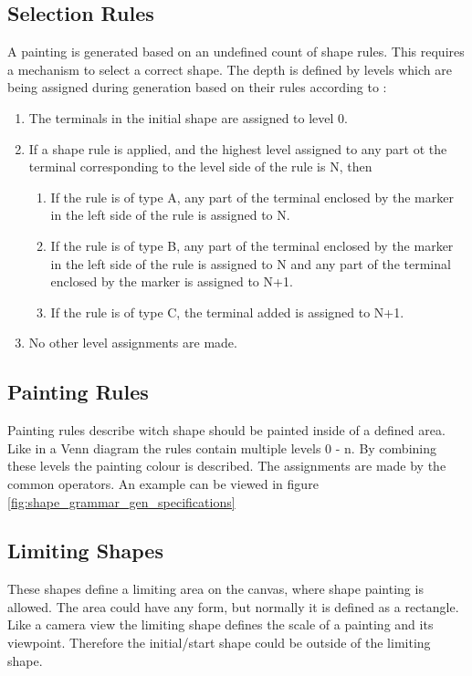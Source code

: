 \subsection{Selection Rules}
\label{sec:Shape_Grammar_Selection_Rules}
A painting is generated based on an undefined count of shape rules. This requires a mechanism to select a correct shape. The depth is defined by levels which are being assigned during generation based on their rules according to \citep{shapeGrammars:1972}:
\begin{displayquote}
    \begin{enumerate}
        \item The terminals in the initial shape are assigned to level 0.
        \item If a shape rule is applied, and the highest level assigned to any part ot the terminal corresponding to the level side of the rule is N, then
        \begin{enumerate}
            \item If the rule is of type A, any part of the terminal enclosed by the marker in the left side of the rule is assigned to N.
            \item If the rule is of type B, any part of the terminal enclosed by the marker in the left side of the rule is assigned to N and any part of the terminal enclosed by the marker is assigned to N+1.
            \item If the rule is of type C, the terminal added is assigned to N+1.
        \end{enumerate}
        \item No other level assignments are made.
    \end{enumerate}
\end{displayquote}

\subsection{Painting Rules}
\label{sec:Shape_Grammar_Painting_Rules}
Painting rules describe witch shape should be painted inside of a defined area. Like in a Venn diagram the rules contain multiple levels 0 - n. By combining these levels the painting colour is described\citep{shapeGrammars:1972}. The assignments are made by the common operators. An example can be viewed in figure \ref{fig:shape_grammar_gen_specifications}

\subsection{Limiting Shapes}
\label{sec:Shape_Grammar_Limiting_Shapes}
These shapes define a limiting area on the canvas, where shape painting is allowed. 
The area could have any form, but normally it is defined as a rectangle. Like a camera view the limiting shape defines the scale of a painting and its viewpoint. Therefore the initial/start shape could be outside of the limiting shape.

